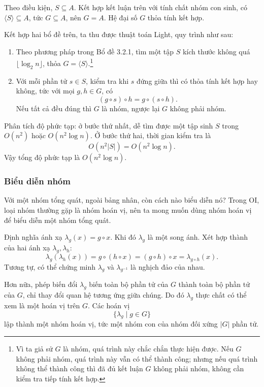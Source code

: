 \documentclass[11pt]{article}
\begin{document}
Theo điều kiện, \(S\subseteq A\). Kết hợp kết luận trên với tính chất nhóm con
sinh, có \(\langle S\rangle\subseteq A\), tức \(G\subseteq A\), nên
\(G=A\). Hệ đại số \(G\) thỏa tính kết hợp.

Kết hợp hai bổ đề trên, ta thu được thuật toán Light, quy trình như sau:
\begin{enumerate}
  \item Theo phương pháp trong Bổ đề 3.2.1, tìm một tập \(S\) kích thước không
  quá \(\lfloor\log_2 n\rfloor\), thỏa \(G=\langle S\rangle\).\footnote{Vì ta
  giả sử \(G\) là nhóm, quá trình này chắc chắn thực hiện được. Nếu \(G\) không
  phải nhóm, quá trình này vẫn có thể thành công; nhưng nếu quá trình không thể
  thành công thì đã đủ kết luận \(G\) không phải nhóm, không cần kiểm tra tiếp
  tính kết hợp.}
  \item Với mỗi phần tử \(s\in S\), kiểm tra khi \(s\) đứng giữa thì có thỏa
  tính kết hợp hay không, tức với mọi \(g,h\in G\), có
  \[
    (g\circ s)\circ h=g\circ(s\circ h).
  \]
  Nếu tất cả đều đúng thì \(G\) là nhóm, ngược lại \(G\) không phải nhóm.
\end{enumerate}

Phân tích độ phức tạp: ở bước thứ nhất, dễ tìm được một tập sinh \(S\) trong
\(O(n^2)\) hoặc \(O(n^2\log n)\). Ở bước thứ hai, thời gian kiểm tra là
\[
  O(n^2|S|)=O(n^2\log n).
\]
Vậy tổng độ phức tạp là \(O(n^2\log n)\).

\subsubsection{Biểu diễn nhóm}

Với một nhóm tổng quát, ngoài bảng nhân, còn cách nào biểu diễn nó? Trong OI,
loại nhóm thường gặp là nhóm hoán vị, nên ta mong muốn dùng nhóm hoán vị để
biểu diễn một nhóm tổng quát.

Định nghĩa ánh xạ \(\lambda_g(x)=g\circ x\). Khi đó \(\lambda_g\) là một song
ánh. Xét hợp thành của hai ánh xạ \(\lambda_g,\lambda_h\):
\[
  \lambda_g(\lambda_h(x))
  =g\circ(h\circ x)
  =(g\circ h)\circ x
  =\lambda_{g\circ h}(x).
\]
Tương tự, có thể chứng minh \(\lambda_g\) và \(\lambda_{g^{-1}}\) là nghịch đảo
của nhau.

Hơn nữa, phép biến đổi \(\lambda_g\) biến toàn bộ phần tử của \(G\) thành toàn
bộ phần tử của \(G\), chỉ thay đổi quan hệ tương ứng giữa chúng. Do đó
\(\lambda_g\) thực chất có thể xem là một hoán vị trên \(G\). Các hoán vị
\[
  \{\lambda_g\mid g\in G\}
\]
lập thành một nhóm hoán vị, tức một nhóm con của nhóm đối xứng \(|G|\) phần tử.
\end{document}
